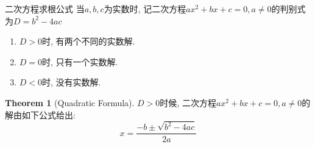 \documentclass{beamer}
\theoremstyle{definition}
\newtheorem{theo}[defn]{Theorem}
\newcommand{\bb}[1]{\mathbb{#1}}
\newenvironment{enu}{\begin{enumerate}[(1)]}{\end{enumerate}}
\begin{document}
\begin{frame}{二次方程求根公式}
    当$a,b,c$为实数时, 记二次方程$ax^2+bx+c=0,a\neq 0$的判别式为$D=b^2-4ac$
    \begin{enu}
        \item $D>0$时, 有两个不同的实数解.
        \item $D=0$时, 只有一个实数解.
        \item $D<0$时,   没有实数解.
    \end{enu}
    \begin{theo}[Quadratic Formula]
        $D>0$时候, 二次方程$ax^2+bx+c=0,a\neq 0$的解由如下公式给出:
        \begin{equation*}
            x=\frac{-b\pm \sqrt{b^2-4ac}}{2a}
        \end{equation*}
    \end{theo}
\end{frame}

\end{document}
